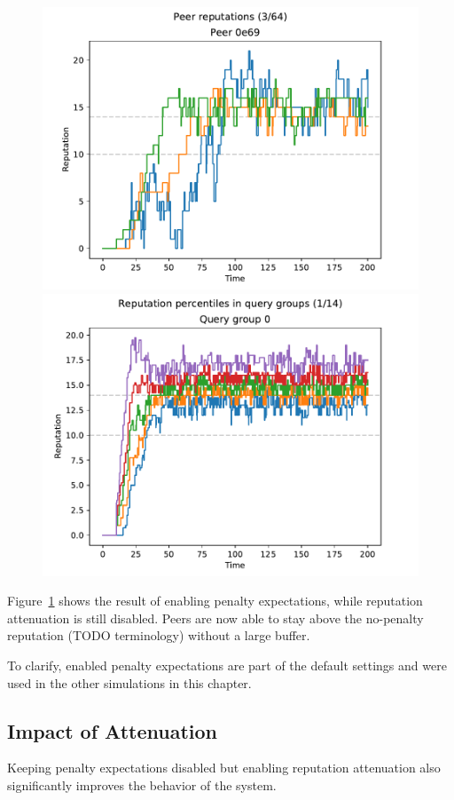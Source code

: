 \begin{figure}[t]
\centering
\includegraphics[width=0.5\columnwidth]{figures/expectations_on_no_att_peer_reps_3_of_64}%
\includegraphics[width=0.5\columnwidth]{figures/expectations_on_no_att_rep_percs_1_of_14}
\label{fig:penalty_expectations_on_no_att_peer_reps_percs}
\end{figure}

Figure~\ref{fig:penalty_expectations_on_no_att_peer_reps_percs} shows the result
of enabling penalty expectations, while reputation attenuation is still
disabled. Peers are now able to stay above the no-penalty reputation (TODO
terminology) without a large buffer.

To clarify, enabled penalty expectations are part of the default settings and
were used in the other simulations in this chapter.

\subsection{Impact of Attenuation}
Keeping penalty expectations disabled but enabling reputation attenuation also
significantly improves the behavior of the system.

